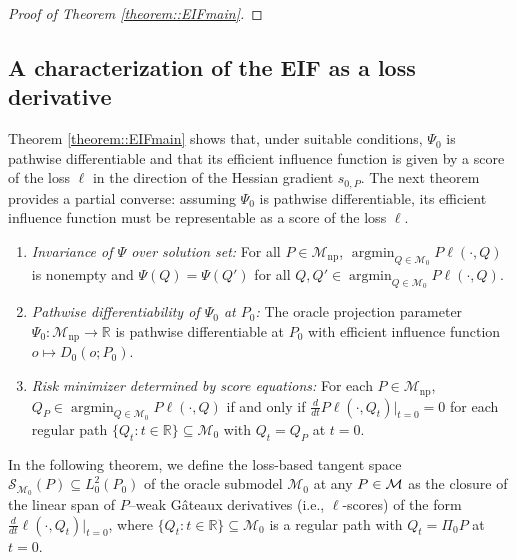 \documentclass[11pt]{article}
\DeclareMathOperator*{\argmin}{argmin}
\theoremstyle{definition}
\begin{document}
\begin{proof}[Proof of Theorem \ref{theorem::EIFmain}]
 

 
\end{proof}


\subsection{A characterization of the EIF as a loss derivative}

Theorem \ref{theorem::EIFmain} shows that, under suitable conditions, \(\Psi_0\) is pathwise differentiable and that its efficient influence function is given by a score of the loss \(\ell\) in the direction of the Hessian gradient \(s_{0,P}\). The next theorem provides a partial converse: assuming \(\Psi_0\) is pathwise differentiable, its efficient influence function must be representable as a score of the loss \(\ell\).


 \begin{enumerate}[label=(D\arabic*), ref=D\arabic*,series=cond]
\item \textit{Invariance of $\Psi$ over solution set:} For all $P \in \mathcal{M}_{\mathrm{np}}$, $\argmin_{Q \in \mathcal{M}_0} P\ell(\cdot, Q)$ is nonempty and $\Psi(Q) = \Psi(Q')$ for all $Q, Q' \in \argmin_{Q \in \mathcal{M}_0} P\ell(\cdot, Q) $.   \label{cond::lossProjIdent}
\item  \textit{Pathwise differentiability of $\Psi_0$ at $P_0$:} The oracle projection parameter $\Psi_0:\mathcal{M}_{\mathrm{np}}\rightarrow\mathbb{R}$  is pathwise differentiable at $P_0$ with efficient influence function $o \mapsto D_0(o; P_0)$.
\label{cond::oracleParamPathwise}
\item \textit{Risk minimizer determined by score equations:} For each $P \in \mathcal{M}_{\mathrm{np}}$, $Q_P \in \argmin_{Q \in \mathcal{M}_0} P \ell(\cdot, Q)$ if and only if $\frac{d}{dt} P \ell(\cdot,Q_t)\big |_{t=0} = 0$ for each regular path $\{Q_t: t \in \mathbb{R}\} \subseteq \mathcal{M}_0$ with $Q_t = Q_P$ at $t=0$.   \label{cond::lossProjDeriv}
\end{enumerate}


 

In the following theorem, we define the loss-based tangent space $\mathcal{S}_{\mathcal{M}_0}(P)\subseteq L^2_0(P_0)$ of the oracle submodel $\mathcal{M}_0$ at any $P\in {\cal M}$ as the closure of the linear span of $P$--weak G\^{a}teaux derivatives (i.e., $\ell$-scores) of the form $\frac{d}{dt}  \ell(\cdot, Q_t)  \big|_{t = 0}$, where $\{Q_{t}: t \in \mathbb{R}\} \subseteq \mathcal{M}_0$ is a regular path with $Q_{t} = \Pi_0P$ at $t=0$.  
\end{document}
